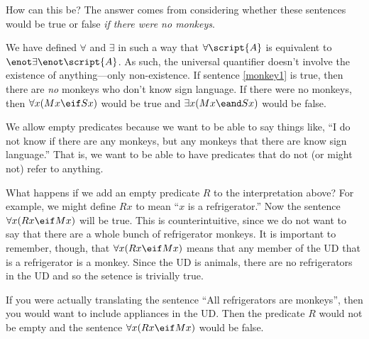 How can this be? The answer comes from considering whether these sentences would be true or false \emph{if there were no monkeys}.

We have defined $\forall$ and $\exists$ in such a way that $\forall\script{A}$ is equivalent to $\enot \exists\enot \script{A}$. As such, the universal quantifier doesn't involve the existence of anything---only non-existence. If sentence \ref{monkey1} is true, then there are \emph{no} monkeys who don't know sign language. If there were no monkeys, then $\forall x(Mx \eif Sx)$ would be true and $\exists x(Mx \eand Sx)$ would be false.

We allow empty predicates because we want to be able to say things like, ``I do not know if there are any monkeys, but any monkeys that there are know sign language.'' That is, we want to be able to have predicates that do not (or might not) refer to anything.


What happens if we add an empty predicate $R$ to the interpretation above? For example, we might define $Rx$ to mean ``$x$ is a refrigerator.'' Now the sentence $\forall x(Rx \eif Mx)$ will be true. This is counterintuitive, since we do not want to say that there are a whole bunch of refrigerator monkeys. It is important to remember, though, that $\forall x(Rx \eif Mx)$ means that any member of the UD that is a refrigerator is a monkey. Since the UD is animals, there are no refrigerators in the UD and so the setence is trivially true.

If you were actually translating the sentence ``All refrigerators are monkeys'', then you would want to include appliances in the UD. Then the predicate $R$ would not be empty and the sentence $\forall x(Rx \eif Mx)$ would be false.

\begin{table}[t]
\end{table}

